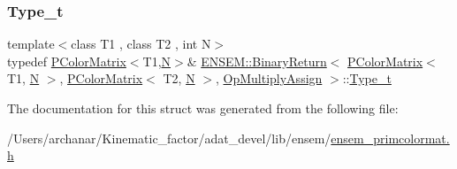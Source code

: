 \subsubsection{\texorpdfstring{Type\_t}{Type\_t}\hspace{0.1cm}{\footnotesize\ttfamily [2/2]}}
{\footnotesize\ttfamily template$<$class T1 , class T2 , int N$>$ \\
typedef \mbox{\hyperlink{classENSEM_1_1PColorMatrix}{P\+Color\+Matrix}}$<$T1,\mbox{\hyperlink{operator__name__util_8cc_a7722c8ecbb62d99aee7ce68b1752f337}{N}}$>$\& \mbox{\hyperlink{structENSEM_1_1BinaryReturn}{E\+N\+S\+E\+M\+::\+Binary\+Return}}$<$ \mbox{\hyperlink{classENSEM_1_1PColorMatrix}{P\+Color\+Matrix}}$<$ T1, \mbox{\hyperlink{operator__name__util_8cc_a7722c8ecbb62d99aee7ce68b1752f337}{N}} $>$, \mbox{\hyperlink{classENSEM_1_1PColorMatrix}{P\+Color\+Matrix}}$<$ T2, \mbox{\hyperlink{operator__name__util_8cc_a7722c8ecbb62d99aee7ce68b1752f337}{N}} $>$, \mbox{\hyperlink{structENSEM_1_1OpMultiplyAssign}{Op\+Multiply\+Assign}} $>$\+::\mbox{\hyperlink{structENSEM_1_1BinaryReturn_3_01PColorMatrix_3_01T1_00_01N_01_4_00_01PColorMatrix_3_01T2_00_01N_01_4_00_01OpMultiplyAssign_01_4_a4e651c3dec8d84b6018be3b261e51570}{Type\+\_\+t}}}



The documentation for this struct was generated from the following file\+:\begin{DoxyCompactItemize}
\item 
/\+Users/archanar/\+Kinematic\+\_\+factor/adat\+\_\+devel/lib/ensem/\mbox{\hyperlink{lib_2ensem_2ensem__primcolormat_8h}{ensem\+\_\+primcolormat.\+h}}\end{DoxyCompactItemize}
